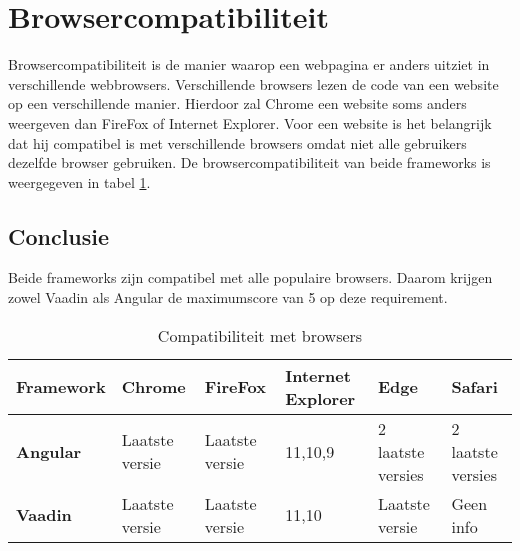 \section{Browsercompatibiliteit}
Browsercompatibiliteit is de manier waarop een webpagina er anders uitziet in verschillende webbrowsers. Verschillende browsers lezen de code van een website op een verschillende manier. Hierdoor zal Chrome een website soms anders weergeven dan FireFox of Internet Explorer. Voor een website is het belangrijk dat hij compatibel is met verschillende browsers omdat niet alle gebruikers dezelfde browser gebruiken. 
De browsercompatibiliteit van beide frameworks is weergegeven in tabel  \ref{table:browsercompatibiliteit}.

\subsection{Conclusie}
Beide frameworks zijn compatibel met alle populaire browsers. Daarom krijgen zowel Vaadin als Angular de maximumscore van 5 op deze requirement.


\begin{table}[H]
	\begin{tabular}{|l|l|l|l|l|l|}
		\hline
		\textbf{Framework} & \textbf{Chrome} & \textbf{FireFox} & \textbf{Internet Explorer} & \textbf{Edge}     & \textbf{Safari}   \\ \hline
		\textbf{Angular}   & Laatste versie  & Laatste versie   & 11,10,9                    & 2 laatste versies & 2 laatste versies \\ \hline
		\textbf{Vaadin}    & Laatste versie  & Laatste versie   & 11,10                      & Laatste versie    & Geen info         \\ \hline
	\end{tabular}
\caption{Compatibiliteit met browsers}
\label{table:browsercompatibiliteit}
\end{table}



